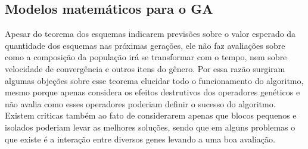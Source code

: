 %
%

%

\subsection{Modelos matemáticos para o GA}
Apesar do teorema dos esquemas indicarem previsões sobre o valor esperado da quantidade dos esquemas nas próximas gerações, ele não faz avaliações sobre como a composição da população irá se transformar com o tempo, nem sobre velocidade de convergência e outros itens do gênero. Por essa razão surgiram algumas objeções sobre esse teorema elucidar todo o funcionamento do algoritmo, mesmo porque apenas considera os efeitos destrutivos dos operadores genéticos e não avalia como esses operadores poderiam definir o sucesso do algoritmo. Existem criticas também ao fato de considerarem apenas que blocos pequenos e isolados poderiam levar as melhores soluções, sendo que em alguns problemas o que existe é a interação entre diversos genes levando a uma boa avaliação.

